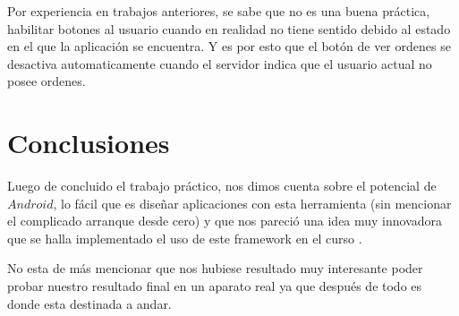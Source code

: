 \documentclass[english]{article}
\begin{document}
Por experiencia en trabajos anteriores, se sabe que no es una buena
práctica, habilitar botones al usuario cuando en realidad no tiene
sentido debido al estado en el que la aplicación se encuentra. Y es
por esto que el botón de ver ordenes se desactiva automaticamente
cuando el servidor indica que el usuario actual no posee ordenes.\\



\section{Conclusiones}

Luego de concluido el trabajo práctico, nos dimos cuenta sobre el
potencial de $Android$, lo fácil que es diseñar aplicaciones con
esta herramienta (sin mencionar el complicado arranque desde cero)
y que nos pareció una idea muy innovadora que se halla implementado
el uso de este framework en el curso .

No esta de más mencionar que nos hubiese resultado muy interesante
poder probar nuestro resultado final en un aparato real ya que después
de todo es donde esta destinada a andar.
\end{document}
